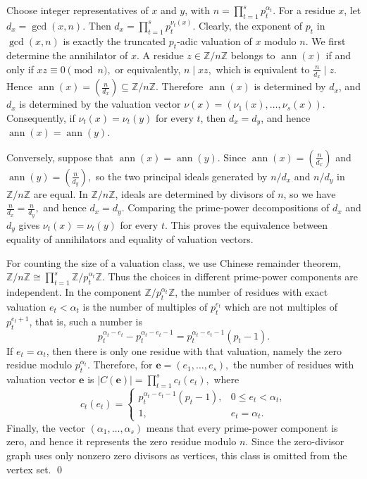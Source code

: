 \documentclass[12pt]{article}
\theoremstyle{definition}
\renewenvironment{proof}{{\bf \noindent Proof.}}{\qed}
\begin{document}
\begin{proof}
	Choose integer representatives of $x$ and $y$, with 
	$ n=\prod_{t=1}^{s}p_t^{\alpha_t}. $
	For a residue $x$, let
	$ d_x=\gcd(x,n). $
	Then
	$ d_x=\prod_{t=1}^{s}p_t^{\nu_t(x)}. $
	Clearly, the exponent of $p_t$ in $\gcd(x,n)$ is exactly the truncated
	$p_t$-adic valuation of $x$ modulo $n$. We first determine the annihilator of $x$.  A residue $z\in \mathbb{Z}/n\mathbb{Z}$ belongs
	to $\operatorname{ann}(x)$ if and only if
	 $xz\equiv 0 \pmod n, $
	or equivalently,
	$ n\mid xz,$  which is equivalent to
	$ \frac{n}{d_x}\mid z. $
	Hence
	$ \operatorname{ann}(x)=\left(\frac{n}{d_x}\right)
	\subseteq \mathbb{Z}/n\mathbb{Z}. $
	Therefore $\operatorname{ann}(x)$ is determined by $d_x$, and $d_x$ is determined by the
	valuation vector
	$ \nu(x)=(\nu_1(x),\ldots,\nu_s(x)). $
	Consequently, if $\nu_t(x)=\nu_t(y)$ for every $t$, then $d_x=d_y$, and hence
	$\operatorname{ann}(x)=\operatorname{ann}(y)$.
	
	 Conversely, suppose that $\operatorname{ann}(x)=\operatorname{ann}(y)$.  Since
	$ \operatorname{ann}(x)=\left(\frac{n}{d_x}\right)$ and $ \operatorname{ann}(y)=\left(\frac{n}{d_y}\right), $ so
	the two principal ideals generated by $n/d_x$ and $n/d_y$ in $\mathbb{Z}/n\mathbb{Z}$ are
	equal.  In $\mathbb{Z}/n\mathbb{Z}$, ideals are determined by divisors of $n$, so we have 
	$ \frac{n}{d_x}=\frac{n}{d_y}, $
	and hence $d_x=d_y$.  Comparing the prime-power decompositions of $d_x$ and
	$d_y$ gives
	$ \nu_t(x)=\nu_t(y) $ for every $t. $
	This proves the equivalence between equality of annihilators and equality of
	valuation vectors.
	
	 For counting the size of a valuation class, we use Chinese remainder theorem,
	$ \mathbb{Z}/n\mathbb{Z}\cong \prod_{t=1}^{s}\mathbb{Z}/p_t^{\alpha_t}\mathbb{Z}.$
	Thus the choices in different prime-power components are independent.  In the
	component $\mathbb{Z}/p_t^{\alpha_t}\mathbb{Z}$, the number of residues with exact
	valuation $e_t<\alpha_t$ is the number of multiples of $p_t^{e_t}$ which are
	not multiples of $p_t^{e_t+1}$, that is, such a number is
	$$
	p_t^{\alpha_t-e_t}-p_t^{\alpha_t-e_t-1}
	=
	p_t^{\alpha_t-e_t-1}(p_t-1).
	$$
	If $e_t=\alpha_t$, then there is only one residue with that valuation, namely
	the zero residue modulo $p_t^{\alpha_t}$. Therefore, for
	$ \mathbf e=(e_1,\ldots,e_s), $
	the number of residues with valuation vector $\mathbf e$ is
	$ |C(\mathbf e)|
	=
	\prod_{t=1}^{s}c_t(e_t), $
	where
	$$
	c_t(e_t)=
	\begin{cases}
		p_t^{\alpha_t-e_t-1}(p_t-1),&0\leq e_t<\alpha_t,\\
		1,&e_t=\alpha_t.
	\end{cases}
	$$
	Finally, the vector
	$ (\alpha_1,\ldots,\alpha_s) $
	means that every prime-power component is zero, and hence it represents the
	zero residue modulo $n$.  Since the zero-divisor graph uses only nonzero zero
	divisors as vertices, this class is omitted from the vertex set.
\end{proof}
\end{document}
